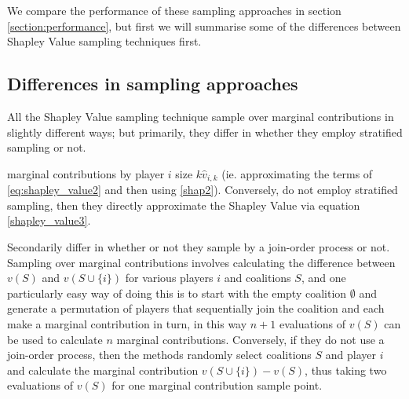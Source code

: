 We \DIFdelbegin {}\DIFdelend compare the performance of these sampling approaches in section \ref{section:performance}, but first we will summarise some of the differences between \DIFaddbegin {}\DIFaddend Shapley Value sampling techniques first.


\subsection{Differences in sampling approaches}

All the Shapley Value sampling technique sample over marginal contributions in slightly different ways; but primarily, they differ in whether they employ stratified sampling or not.
\DIFdelbegin {}\DIFdelend \DIFaddbegin 

\DIFaddend marginal contributions by player $i$ \DIFdelbegin {}\DIFdelend \DIFaddbegin {}\DIFaddend size $k$\DIFdelbegin {}\DIFdelend \DIFaddbegin {}\DIFaddend $\hat{v}_{i,k}$ (ie. approximating the terms of \eqref{eq:shapley_value2} and then using \eqref{shap2})\DIFaddbegin {}\DIFaddend .
Conversely, \DIFdelbegin {}\DIFdelend \DIFaddbegin {}\DIFaddend do not employ stratified sampling, then they directly approximate the Shapley Value via equation \eqref{shapley_value3}.

Secondarily \DIFdelbegin {}\DIFdelend \DIFaddbegin {}\DIFaddend differ in whether or not they sample by a join-order process or not. Sampling over marginal contributions involves calculating the difference between $v(S)$ and $v(S\cup\{i\})$ for various players $i$ and coalitions $S$, and one particularly easy way of doing this is to start with the empty coalition $\emptyset$ and generate a permutation of players that sequentially join the coalition and each make a marginal contribution in turn, in this way $n+1$ evaluations of $v(S)$ can be used to calculate $n$ marginal contributions.
Conversely, if they do not use a join-order process, then the methods randomly select coalitions $S$ and player $i$ and calculate the marginal contribution $v(S\cup\{i\}) - v(S)$, thus taking two evaluations of $v(S)$ for one marginal contribution sample point.

